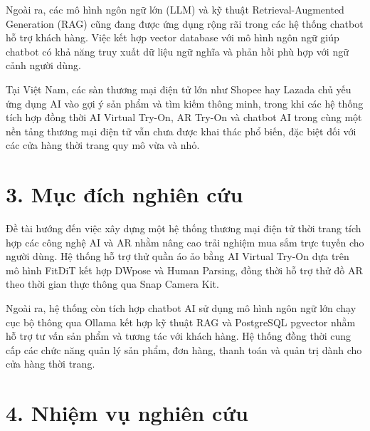 Ngoài ra, các mô hình ngôn ngữ lớn (LLM) và kỹ thuật Retrieval-Augmented Generation (RAG) cũng đang được ứng dụng rộng rãi trong các hệ thống chatbot hỗ trợ khách hàng. Việc kết hợp vector database với mô hình ngôn ngữ giúp chatbot có khả năng truy xuất dữ liệu ngữ nghĩa và phản hồi phù hợp với ngữ cảnh người dùng.

Tại Việt Nam, các sàn thương mại điện tử lớn như Shopee hay Lazada chủ yếu ứng dụng AI vào gợi ý sản phẩm và tìm kiếm thông minh, trong khi các hệ thống tích hợp đồng thời AI Virtual Try-On, AR Try-On và chatbot AI trong cùng một nền tảng thương mại điện tử vẫn chưa được khai thác phổ biến, đặc biệt đối với các cửa hàng thời trang quy mô vừa và nhỏ.

\section*{3. Mục đích nghiên cứu}

Đề tài hướng đến việc xây dựng một hệ thống thương mại điện tử thời trang tích hợp các công nghệ AI và AR nhằm nâng cao trải nghiệm mua sắm trực tuyến cho người dùng. Hệ thống hỗ trợ thử quần áo ảo bằng AI Virtual Try-On dựa trên mô hình FitDiT kết hợp DWpose và Human Parsing, đồng thời hỗ trợ thử đồ AR theo thời gian thực thông qua Snap Camera Kit.

Ngoài ra, hệ thống còn tích hợp chatbot AI sử dụng mô hình ngôn ngữ lớn chạy cục bộ thông qua Ollama kết hợp kỹ thuật RAG và PostgreSQL pgvector nhằm hỗ trợ tư vấn sản phẩm và tương tác với khách hàng. Hệ thống đồng thời cung cấp các chức năng quản lý sản phẩm, đơn hàng, thanh toán và quản trị dành cho cửa hàng thời trang.

\section*{4. Nhiệm vụ nghiên cứu}

